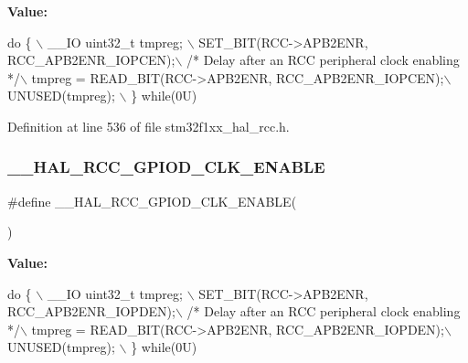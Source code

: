 {\bfseries Value\+:}
\begin{DoxyCode}
\textcolor{keywordflow}{do} \{ \(\backslash\)
                                        \_\_IO uint32\_t tmpreg; \(\backslash\)
                                        SET\_BIT(RCC->APB2ENR, RCC\_APB2ENR\_IOPCEN);\(\backslash\)
                                        \textcolor{comment}{/* Delay after an RCC peripheral clock enabling */}\(\backslash\)
                                        tmpreg = READ\_BIT(RCC->APB2ENR, RCC\_APB2ENR\_IOPCEN);\(\backslash\)
                                        UNUSED(tmpreg); \(\backslash\)
                                      \} \textcolor{keywordflow}{while}(0U)
\end{DoxyCode}


Definition at line 536 of file stm32f1xx\+\_\+hal\+\_\+rcc.\+h.

\mbox{\label{group___r_c_c___a_p_b2___clock___enable___disable_ga74340ce0f556e370aafc2b8ecdf2dd31}} 
\subsubsection{\texorpdfstring{\+\_\+\+\_\+\+H\+A\+L\+\_\+\+R\+C\+C\+\_\+\+G\+P\+I\+O\+D\+\_\+\+C\+L\+K\+\_\+\+E\+N\+A\+B\+LE}{\_\_HAL\_RCC\_GPIOD\_CLK\_ENABLE}}
{\footnotesize\ttfamily \#define \+\_\+\+\_\+\+H\+A\+L\+\_\+\+R\+C\+C\+\_\+\+G\+P\+I\+O\+D\+\_\+\+C\+L\+K\+\_\+\+E\+N\+A\+B\+LE(\begin{DoxyParamCaption}{ }\end{DoxyParamCaption})}

{\bfseries Value\+:}
\begin{DoxyCode}
\textcolor{keywordflow}{do} \{ \(\backslash\)
                                        \_\_IO uint32\_t tmpreg; \(\backslash\)
                                        SET\_BIT(RCC->APB2ENR, RCC\_APB2ENR\_IOPDEN);\(\backslash\)
                                        \textcolor{comment}{/* Delay after an RCC peripheral clock enabling */}\(\backslash\)
                                        tmpreg = READ\_BIT(RCC->APB2ENR, RCC\_APB2ENR\_IOPDEN);\(\backslash\)
                                        UNUSED(tmpreg); \(\backslash\)
                                      \} \textcolor{keywordflow}{while}(0U)
\end{DoxyCode}


